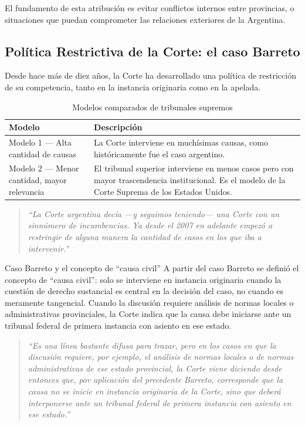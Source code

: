 \documentclass[12pt,oneside]{book}
\begin{document}
El fundamento de esta atribución es evitar conflictos internos entre provincias, o situaciones que puedan comprometer las relaciones exteriores de la Argentina.

\subsection{Política Restrictiva de la Corte: el caso Barreto}

Desde hace más de diez años, la Corte ha desarrollado una política de restricción de su competencia, tanto en la instancia originaria como en la apelada.

\begin{table}[H]
\centering
\caption{Modelos comparados de tribunales supremos}
\begin{tabularx}{\textwidth}{>{\raggedright\arraybackslash}p{} X}
\toprule
\textbf{Modelo} & \textbf{Descripción} \\
\midrule
Modelo 1 — Alta cantidad de causas & La Corte interviene en muchísimas causas, como históricamente fue el caso argentino. \\
Modelo 2 — Menor cantidad, mayor relevancia & El tribunal superior interviene en menos casos pero con mayor trascendencia institucional. Es el modelo de la Corte Suprema de los Estados Unidos. \\
\bottomrule
\end{tabularx}
\end{table}

\begin{quote}
\itshape
``La Corte argentina decía —y seguimos teniendo— una Corte con un sinnúmero de incumbencias. Ya desde el 2007 en adelante empezó a restringir de alguna manera la cantidad de casos en los que iba a intervenir.''
\end{quote}

\begin{example}{Caso Barreto y el concepto de ``causa civil''}
A partir del caso Barreto se definió el concepto de ``causa civil'': solo se interviene en instancia originaria cuando la cuestión de derecho sustancial es central en la decisión del caso, no cuando es meramente tangencial. Cuando la discusión requiere análisis de normas locales o administrativas provinciales, la Corte indica que la causa debe iniciarse ante un tribunal federal de primera instancia con asiento en ese estado.
\end{example}

\begin{quote}
\itshape
``Es una línea bastante difusa para trazar, pero en los casos en que la discusión requiere, por ejemplo, el análisis de normas locales o de normas administrativas de ese estado provincial, la Corte viene diciendo desde entonces que, por aplicación del precedente Barreto, corresponde que la causa no se inicie en instancia originaria de la Corte, sino que deberá interponerse ante un tribunal federal de primera instancia con asiento en ese estado.''
\end{quote}
\end{document}

